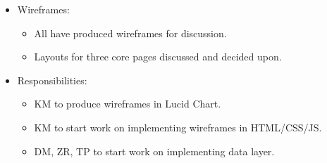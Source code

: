 \documentclass{article}
\begin{document}
\begin{itemize}
\item Wireframes:
  \begin{itemize}
  \item All have produced wireframes for discussion.
  \item Layouts for three core pages discussed and decided upon.
  \end{itemize}
\item Responsibilities:
  \begin{itemize}
  \item KM to produce wireframes in Lucid Chart.
  \item KM to start work on implementing wireframes in HTML/CSS/JS.
  \item DM, ZR, TP to start work on implementing data layer.
  \end{itemize}
\end{itemize}
\end{document}
